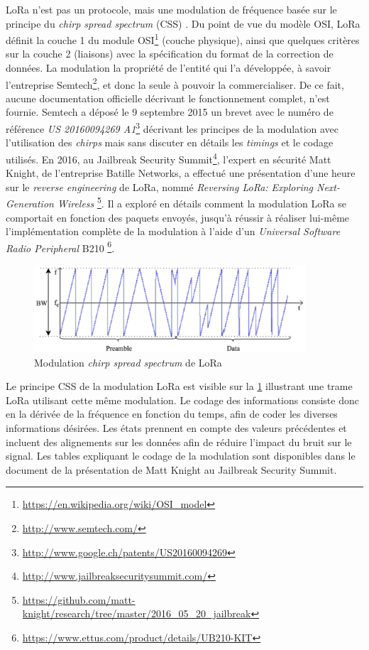 LoRa n'est pas un protocole, mais une modulation de fréquence basée sur le principe du \textit{chirp spread spectrum} (CSS) \cite{LPWANWik63:online}. Du point de vue du modèle OSI, LoRa définit la couche 1 du module OSI\footnote{\url{https://en.wikipedia.org/wiki/OSI_model}} (couche physique), ainsi que quelques critères sur la couche 2 (liaisons) avec la spécification du format de la correction de données. La modulation la propriété de l'entité qui l'a développée, à savoir l'entreprise Semtech\footnote{\url{http://www.semtech.com/}}, et donc la seule à pouvoir la commercialiser. De ce fait, aucune documentation officielle décrivant le fonctionnement complet, n'est fournie. Semtech a déposé le 9 septembre 2015 un brevet avec le numéro de référence \textit{US 20160094269 A1}\footnote{\url{http://www.google.ch/patents/US20160094269}} décrivant les principes de la modulation avec l'utilisation des \textit{chirps} mais sans discuter en détails les \textit{timings} et le codage utilisés. En 2016, au Jailbreak Security Summit\footnote{\url{http://www.jailbreaksecuritysummit.com/}}, l'expert en sécurité Matt Knight, de l'entreprise Batille Networks, a effectué une présentation d'une heure sur le \textit{reverse engineering} de LoRa, nommé \textit{Reversing LoRa: Exploring Next-Generation Wireless} \footnote{\url{https://github.com/matt-knight/research/tree/master/2016_05_20_jailbreak}}. Il a exploré en détails comment la modulation LoRa se comportait en fonction des paquets envoyés, jusqu'à réussir à réaliser lui-même l'implémentation complète de la modulation à l'aide d'un \textit{Universal Software Radio Peripheral} B210 \footnote{\url{https://www.ettus.com/product/details/UB210-KIT}}. 

\begin{figure}[ht!]
    \centering
    \includegraphics[width=0.9\textwidth]{Figures/StateOfTheArt/lora_modulation_css.png}
    \caption{Modulation \textit{chirp spread spectrum} de LoRa}
    \label{fig-lora_modulation_css}
\end{figure}


Le principe CSS de la modulation LoRa est visible sur la \cref{fig-lora_modulation_css} illustrant une trame LoRa utilisant cette même modulation. Le codage des informations consiste donc en la dérivée de la fréquence en fonction du temps, afin de coder les diverses informations désirées. Les états prennent en compte des valeurs précédentes et incluent des alignements sur les données afin de réduire l'impact du bruit sur le signal. Les tables expliquant le codage de la modulation sont disponibles dans le document de la présentation de Matt Knight au Jailbreak Security Summit.\\


